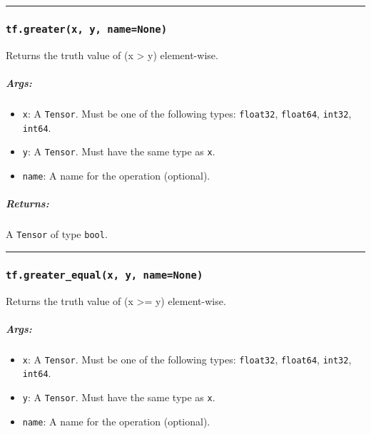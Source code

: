 \begin{center}\rule{0.5\linewidth}{\linethickness}\end{center}

\subsubsection{\texorpdfstring{\texttt{tf.greater(x,\ y,\ name=None)}
}{tf.greater(x, y, name=None) }}\label{tf.greaterx-y-namenone}

Returns the truth value of (x \textgreater{} y) element-wise.

\subparagraph{Args: }\label{args-12}

\begin{itemize}
\tightlist
\item
  \texttt{x}: A \texttt{Tensor}. Must be one of the following types:
  \texttt{float32}, \texttt{float64}, \texttt{int32}, \texttt{int64}.
\item
  \texttt{y}: A \texttt{Tensor}. Must have the same type as \texttt{x}.
\item
  \texttt{name}: A name for the operation (optional).
\end{itemize}

\subparagraph{Returns: }\label{returns-12}

A \texttt{Tensor} of type \texttt{bool}.

\begin{center}\rule{0.5\linewidth}{\linethickness}\end{center}

\subsubsection{\texorpdfstring{\texttt{tf.greater\_equal(x,\ y,\ name=None)}
}{tf.greater\_equal(x, y, name=None) }}\label{tf.greaterux5fequalx-y-namenone}

Returns the truth value of (x \textgreater{}= y) element-wise.

\subparagraph{Args: }\label{args-13}

\begin{itemize}
\tightlist
\item
  \texttt{x}: A \texttt{Tensor}. Must be one of the following types:
  \texttt{float32}, \texttt{float64}, \texttt{int32}, \texttt{int64}.
\item
  \texttt{y}: A \texttt{Tensor}. Must have the same type as \texttt{x}.
\item
  \texttt{name}: A name for the operation (optional).
\end{itemize}

